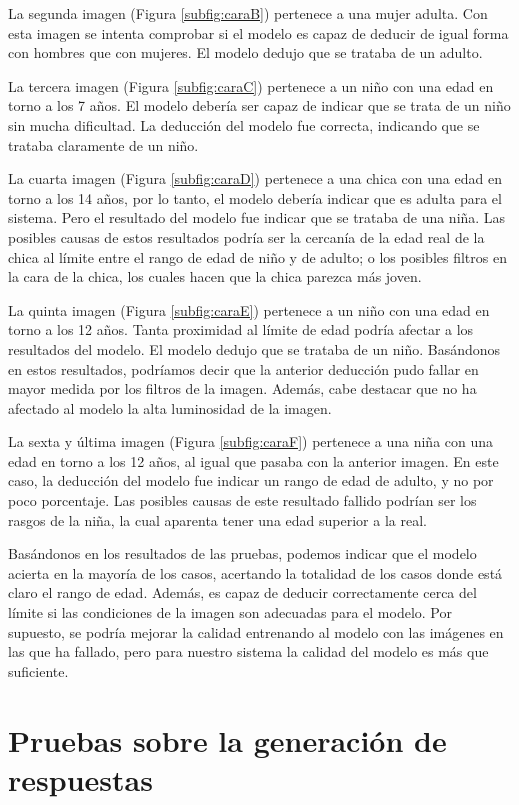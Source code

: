 La segunda imagen (Figura \ref{subfig:caraB}) pertenece a una mujer adulta. Con esta imagen se intenta comprobar si el modelo es capaz de deducir de igual forma con hombres que con mujeres. El modelo dedujo que se trataba de un adulto.

La tercera imagen (Figura \ref{subfig:caraC}) pertenece a un niño con una edad en torno a los 7 años. El modelo debería ser capaz de indicar que se trata de un niño sin mucha dificultad. La deducción del modelo fue correcta, indicando que se trataba claramente de un niño.

La cuarta imagen (Figura \ref{subfig:caraD}) pertenece a una chica con una edad en torno a los 14 años, por lo tanto, el modelo debería indicar que es adulta para el sistema. Pero el resultado del modelo fue indicar que se trataba de una niña. Las posibles causas de estos resultados podría ser la cercanía de la edad real de la chica al límite entre el rango de edad de niño y de adulto; o los posibles filtros en la cara de la chica, los cuales hacen que la chica parezca más joven.

La quinta imagen (Figura \ref{subfig:caraE}) pertenece a un niño con una edad en torno a los 12 años. Tanta proximidad al límite de edad podría afectar a los resultados del modelo. El modelo dedujo que se trataba de un niño. Basándonos en estos resultados, podríamos decir que la anterior deducción pudo fallar en mayor medida por los filtros de la imagen. Además, cabe destacar que no ha afectado al modelo la alta luminosidad de la imagen.

La sexta y última imagen (Figura \ref{subfig:caraF}) pertenece a una niña con una edad en torno a los 12 años, al igual que pasaba con la anterior imagen. En este caso, la deducción del modelo fue indicar un rango de edad de adulto, y no por poco porcentaje. Las posibles causas de este resultado fallido podrían ser los rasgos de la niña, la cual aparenta tener una edad superior a la real.

Basándonos en los resultados de las pruebas, podemos indicar que el modelo acierta en la mayoría de los casos, acertando la totalidad de los casos donde está claro el rango de edad. Además, es capaz de deducir correctamente cerca del límite si las condiciones de la imagen son adecuadas para el modelo. Por supuesto, se podría mejorar la calidad entrenando al modelo con las imágenes en las que ha fallado, pero para nuestro sistema la calidad del modelo es más que suficiente.


\section{Pruebas sobre la generación de respuestas}








